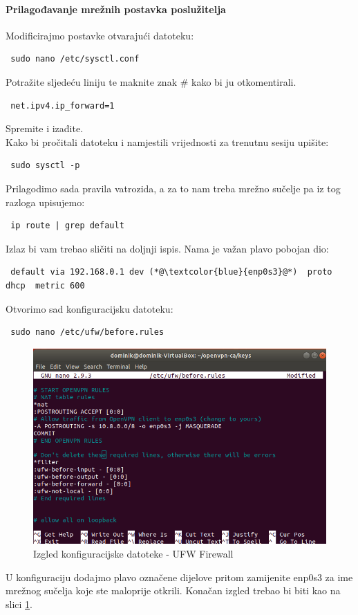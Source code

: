 \paragraph*{Prilagođavanje mrežnih postavka poslužitelja}
\hfill \smallbreak
Modificirajmo postavke otvarajući datoteku:
\begin{lstlisting}
 sudo nano /etc/sysctl.conf
\end{lstlisting}
Potražite sljedeću liniju te maknite znak \# kako bi ju otkomentirali. 
\begin{lstlisting}
 net.ipv4.ip_forward=1
\end{lstlisting}
Spremite i izađite. \\
Kako bi pročitali datoteku i namjestili vrijednosti za trenutnu sesiju upišite:
\begin{lstlisting}
 sudo sysctl -p
\end{lstlisting}
Prilagodimo sada pravila vatrozida, a za to nam treba mrežno sučelje pa iz tog razloga upisujemo:
\begin{lstlisting}
 ip route | grep default
\end{lstlisting}
Izlaz bi vam trebao sličiti na doljnji ispis. Nama je važan plavo pobojan dio:
\begin{lstlisting}
 default via 192.168.0.1 dev (*@\textcolor{blue}{enp0s3}@*)  proto dhcp  metric 600
\end{lstlisting}
Otvorimo sad konfiguracijsku datoteku:
\begin{lstlisting}
 sudo nano /etc/ufw/before.rules
\end{lstlisting}
\begin{figure}[h]
	\centering
	\includegraphics[width=0.7\linewidth]{"slike/OpenVPN/Screenshot from 2018-12-14 19-06-58"}
	\caption[Izgled konfiguracijske datoteke - UFW Firewall]{Izgled konfiguracijske datoteke - UFW Firewall}
	\label{fig:screenshot-from-2018-12-14-19-06-58}
\end{figure}
U konfiguraciju dodajmo plavo označene dijelove pritom zamijenite enp0s3 za ime mrežnog sučelja koje ste maloprije otkrili. Konačan izgled trebao bi biti kao na slici \ref{fig:screenshot-from-2018-12-14-19-06-58}.
